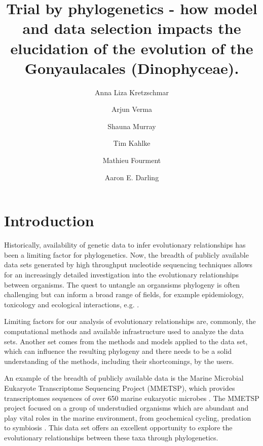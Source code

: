\documentclass[fleqn,10pt,lineno]{wlpeerj} %
\title{Trial by phylogenetics - how model and data selection impacts the elucidation of the evolution of the Gonyaulacales (Dinophyceae).}
\author[1]{Anna Liza Kretzschmar}
\author[2]{Arjun Verma}
\author[2]{Shauna Murray}
\author[1]{Tim Kahlke}
\author[2]{Mathieu Fourment}
\author[2]{Aaron E. Darling}
\affil[1]{The ithree institute, University of Technology Sydney, Australia}
\affil[2]{c3, University of Technology Sydney, Australia}
\begin{document}
\flushbottom
\maketitle
\thispagestyle{empty}



\section*{Introduction}
Historically, availability of genetic data to infer evolutionary relationships has been a limiting factor for phylogenetics.
Now, the breadth of publicly available data sets generated by high throughput nucleotide sequencing techniques allows for an increasingly detailed investigation into the evolutionary relationships between organisms.
The quest to untangle an organsisms phylogeny is often challenging but can inform a broad range of fields, for example epidemiology, toxicology and ecological interactions, e.g. \cite{mctavish2017and,lewis2008episodic,mutreja2011evidence,cavender2009merging,sites2011phylogenetic}.

Limiting factors for our analysis of evolutionary relationships are, commonly, the computational methods and available infrastructure used to analyze the data sets. 
Another set comes from the methods and models applied to the data set, which can influence the resulting phylogeny and there needs to be a solid understanding of the methods, including their shortcomings, by the users.

An example of the breadth of publicly available data is the Marine Microbial Eukaryote Transcriptome Sequencing Project (MMETSP), which provides transcriptomes sequences of over 650 marine eukaryotic microbes \cite{keeling2014marine}. 
The MMETSP project focused on a group of understudied organisms which are abundant and play vital roles in the marine environment, from geochemical cycling, predation to symbiosis \cite{gomez2005list,gomez2012quantitative}. 
This data set offers an excellent opportunity to explore the evolutionary relationships between these taxa through phylogenetics. 
\end{document}
